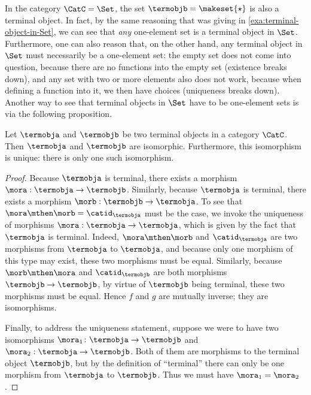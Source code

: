 \begin{remark}\label{rem:terminal-object-renaming}
    In the category $\CatC = \Set$, the set $\termobjb = \makeset{ \star}$ is also a terminal object.
    In fact, by the same reasoning that was giving in \cref{exa:terminal-object-in-Set}, we can see that \emph{any} one-element set is a terminal object in $\Set$.
    Furthermore, one can also reason that, on the other hand, any terminal object in $\Set$ must necessarily be a one-element set: the empty set does not come into question, because there are no functions into the empty set (existence breaks down), and any set with two or more elements  also does not work, because when defining a function into it, we then have choices (uniqueness breaks down).
    Another way to see that terminal objects in $\Set$ have to be one-element sets is via the following proposition.
\end{remark}

\begin{proposition}\label{prop:terminal-objs-isom}
    Let $\termobja$ and $\termobjb$ be two terminal objects in a category $\CatC$.
    Then $\termobja$ and $\termobjb$ are isomorphic. Furthermore, this isomorphism is unique: there is only one such isomorphism. 
\end{proposition}

\begin{proof}
    Because $\termobja$ is terminal, there exists a morphism $\mora : \termobja \to \termobjb$.
    Similarly, because $\termobja$ is terminal, there exists a morphism $\morb : \termobjb \to \termobja$.
    To see that $\mora \mthen \morb = \catid_\termobja$ must be the case, we invoke the uniqueness of morphisms $\mora : \termobja \to \termobja$, which is given by the fact that $\termobja$ is terminal.
    Indeed, $\mora \mthen \morb$ and $\catid_\termobja$ are two morphisms from $\termobja$ to $\termobja$, and because only one morphism of this type may exist, these two morphisms must be equal.
    Similarly, because $\morb \mthen \mora$ and $\catid_\termobjb$ are both morphisms $\termobjb \to \termobjb$, by virtue of $\termobjb$ being terminal, these two morphisms must be equal.
    Hence $f$ and $g$ are mutually inverse; they are isomorphisms.
    
    Finally, to address the uniqueness statement, suppose we were to have two isomorphisms $\mora_1 \colon \termobja \to \termobjb$ and $\mora_2 : \termobja \to \termobjb$. Both of them are morphisms to the terminal object $\termobjb$, but by the definition of ``terminal'' there can only be one morphism from $\termobja$ to  $\termobjb$.  Thus we must have $\mora_1 = \mora_2$.
\end{proof}


